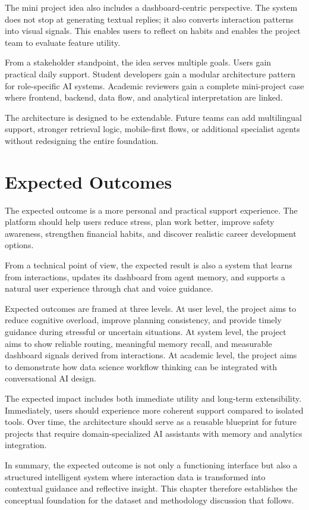 \documentclass[oneside,a4paper,12pt]{report}
\begin{document}
The mini project idea also includes a dashboard-centric perspective. The system does not stop at generating textual replies; it also converts interaction patterns into visual signals. This enables users to reflect on habits and enables the project team to evaluate feature utility.

From a stakeholder standpoint, the idea serves multiple goals. Users gain practical daily support. Student developers gain a modular architecture pattern for role-specific AI systems. Academic reviewers gain a complete mini-project case where frontend, backend, data flow, and analytical interpretation are linked.

The architecture is designed to be extendable. Future teams can add multilingual support, stronger retrieval logic, mobile-first flows, or additional specialist agents without redesigning the entire foundation.

\section{Expected Outcomes}
The expected outcome is a more personal and practical support experience. The platform should help users reduce stress, plan work better, improve safety awareness, strengthen financial habits, and discover realistic career development options.

From a technical point of view, the expected result is also a system that learns from interactions, updates its dashboard from agent memory, and supports a natural user experience through chat and voice guidance.

Expected outcomes are framed at three levels. At user level, the project aims to reduce cognitive overload, improve planning consistency, and provide timely guidance during stressful or uncertain situations. At system level, the project aims to show reliable routing, meaningful memory recall, and measurable dashboard signals derived from interactions. At academic level, the project aims to demonstrate how data science workflow thinking can be integrated with conversational AI design.

The expected impact includes both immediate utility and long-term extensibility. Immediately, users should experience more coherent support compared to isolated tools. Over time, the architecture should serve as a reusable blueprint for future projects that require domain-specialized AI assistants with memory and analytics integration.

In summary, the expected outcome is not only a functioning interface but also a structured intelligent system where interaction data is transformed into contextual guidance and reflective insight. This chapter therefore establishes the conceptual foundation for the dataset and methodology discussion that follows.
\end{document}
